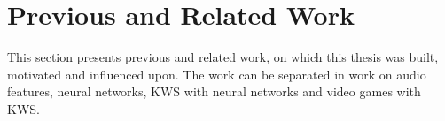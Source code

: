 
\chapter{Previous and Related Work}\label{sec:prev}
This section presents previous and related work, on which this thesis was built, motivated and influenced upon.
The work can be separated in work on audio features, neural networks, KWS with neural networks and video games with KWS.







